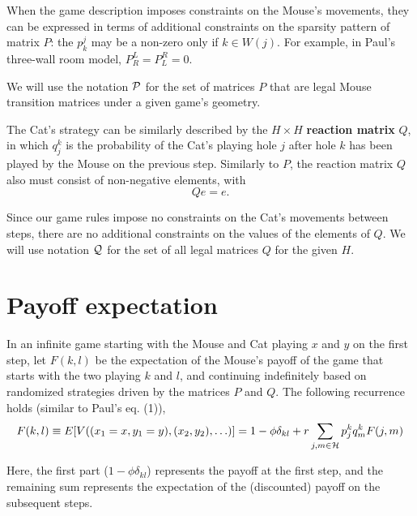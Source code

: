 \documentclass[12pt]{article}
\begin{document}
When the game description imposes constraints on the Mouse's movements, they can be expressed in terms of additional constraints on the sparsity pattern of matrix $P$: the $p^j_k$ may be a non-zero only if $k\in W(j)$. For example, in Paul's three-wall room model, $P^L_R=P^R_L=0$.

We will use the notation $\cal{P}$ for the set of matrices $P$ that are legal Mouse transition matrices under a given game's geometry.

The Cat's strategy can be similarly described by the  $H \times H$ {\bf reaction matrix} $Q$,  in which $q^k_j$ is the probability of the Cat's playing hole $j$ after hole $k$ has been played by the Mouse on the previous step. Similarly to $P$, the reaction matrix $Q$ also must consist of non-negative elements, with 
\begin{equation}
\label{eq:qe}
Q e= e.
\end{equation}

Since our game rules impose no constraints on the Cat's movements between steps, there are no additional constraints on the values of the elements of $Q$. We will use notation $\cal{Q}$ for the set of all legal matrices $Q$ for the given $H$.


\section{Payoff expectation}
In an infinite game starting with the Mouse and Cat playing $x$ and $y$ on the first step, let $F(k,l)$ be the expectation of the Mouse's payoff of the game that starts with the two playing $k$ and $l$, and continuing indefinitely based on randomized strategies driven by the matrices $P$ and $Q$. The following recurrence holds (similar to Paul's eq. (1)),
\begin{equation}
\label{eq:f1}
F(k,l) \equiv E[V((x_1=x,y_1=y),(x_2,y_2),\ldots)] = 1 - \phi \delta_{kl} + r \sum_{j,m \in \cal{H}} p^k_j q^k_m F(j,m)
\end{equation}

Here, the first part ($1 - \phi \delta_{kl}$) represents the payoff at the first step, and the remaining sum represents the expectation of the (discounted) payoff on the subsequent steps.
\end{document}
